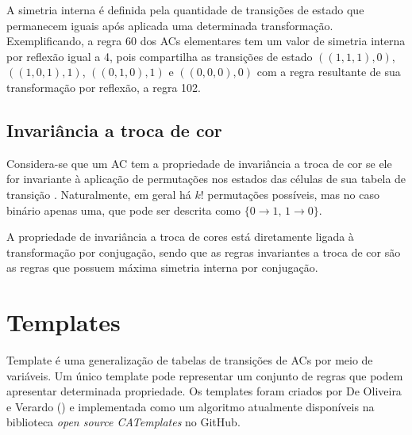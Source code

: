 \documentclass[12pt, a4paper]{article}
\begin{document}


A simetria interna é definida pela quantidade de transições de estado que permanecem iguais após aplicada uma determinada transformação. Exemplificando, a regra 60 dos ACs elementares tem um valor de simetria interna por reflexão igual a 4, pois compartilha as transições de estado $((1,1,1),0)$, $((1,0,1),1)$, $((0,1,0),1)$ e $ ((0,0,0),0)$ com a regra resultante de sua transformação por reflexão, a regra 102.

\subsection{Invariância a troca de cor}
Considera-se que um AC tem a propriedade de invariância a troca de cor se ele for invariante à aplicação de permutações nos estados das células de sua tabela de transição \cite{salo2013color}. Naturalmente, em geral há $k!$ permutações possíveis, mas no caso binário apenas uma, que pode ser descrita como $\{0 \to 1 ,\, 1 \to 0\}$. 

A propriedade de invariância a troca de cores está diretamente ligada à transformação por conjugação, sendo que as regras invariantes a troca de cor são as regras que possuem máxima simetria interna por conjugação.

\section{Templates}
\label{sec:templates}
Template é uma generalização de tabelas de transições de ACs por meio de variáveis. Um único template pode representar um conjunto de regras que podem apresentar determinada propriedade. Os templates foram criados por De Oliveira e Verardo (\citeyear{deOliveira2014}) e implementada como um algoritmo 
atualmente disponíveis na biblioteca \textit{open source CATemplates} \cite{CATemplates} no GitHub.
\end{document}
